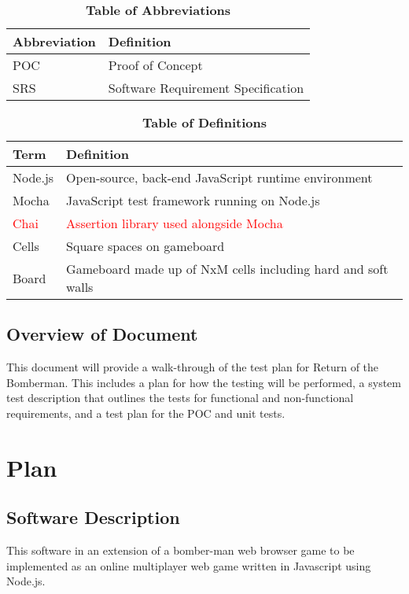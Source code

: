 \documentclass[12pt, titlepage]{article}
\begin{document}
\begin{table}[hbp]
\caption{\textbf{Table of Abbreviations}} \label{Table}

\begin{tabularx}{\textwidth}{p{3cm}X}
\toprule
\textbf{Abbreviation} & \textbf{Definition} \\
\midrule
POC & Proof of Concept\\
SRS & Software Requirement Specification\\
\bottomrule
\end{tabularx}

\end{table}

\begin{table}[!htbp]
\caption{\textbf{Table of Definitions}} \label{Table}

\begin{tabularx}{\textwidth}{p{3cm}X}
\toprule
\textbf{Term} & \textbf{Definition}\\
\midrule
Node.js & Open-source, back-end JavaScript runtime environment\\
Mocha & JavaScript test framework running on Node.js\\
\textcolor{red}{Chai} & \textcolor{red}{Assertion library used alongside Mocha}\\
Cells & Square spaces on gameboard\\
Board & Gameboard made up of NxM cells including hard and soft walls\\
\bottomrule
\end{tabularx}

\end{table}	

\subsection{Overview of Document}

This document will provide a walk-through of the test plan for Return of the Bomberman. This includes a plan for how the testing will be performed, a system test description that outlines the tests for functional and non-functional requirements, and a test plan for the POC and unit tests.

\section{Plan}
	
\subsection{Software Description}
This software in an extension of a bomber-man web browser game to be implemented as an online multiplayer web game written in Javascript using Node.js.
\end{document}
